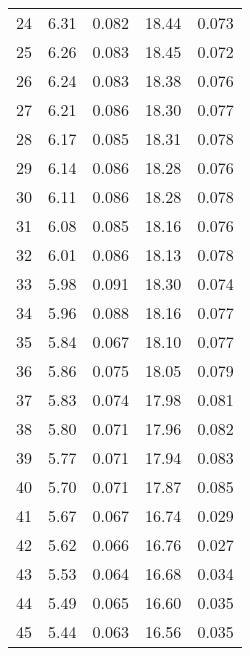 \begin{table}
\begin{tabular}{c|ll|ll}
24 & 6.31 & 0.082 & 18.44 & 0.073 \\
25 & 6.26 & 0.083 & 18.45 & 0.072 \\
26 & 6.24 & 0.083 & 18.38 & 0.076 \\
27 & 6.21 & 0.086 & 18.30 & 0.077 \\
28 & 6.17 & 0.085 & 18.31 & 0.078 \\
29 & 6.14 & 0.086 & 18.28 & 0.076 \\
30 & 6.11 & 0.086 & 18.28 & 0.078 \\
31 & 6.08 & 0.085 & 18.16 & 0.076 \\
32 & 6.01 & 0.086 & 18.13 & 0.078 \\
33 & 5.98 & 0.091 & 18.30 & 0.074 \\
34 & 5.96 & 0.088 & 18.16 & 0.077 \\
35 & 5.84 & 0.067 & 18.10 & 0.077 \\
36 & 5.86 & 0.075 & 18.05 & 0.079 \\
37 & 5.83 & 0.074 & 17.98 & 0.081 \\
38 & 5.80 & 0.071 & 17.96 & 0.082 \\
39 & 5.77 & 0.071 & 17.94 & 0.083 \\
40 & 5.70 & 0.071 & 17.87 & 0.085 \\
41 & 5.67 & 0.067 & 16.74 & 0.029 \\
42 & 5.62 & 0.066 & 16.76 & 0.027 \\
43 & 5.53 & 0.064 & 16.68 & 0.034 \\
44 & 5.49 & 0.065 & 16.60 & 0.035 \\
45 & 5.44 & 0.063 & 16.56 & 0.035 \\
               \hline
        \end{tabular}
    \end{table}
    \clearpage

